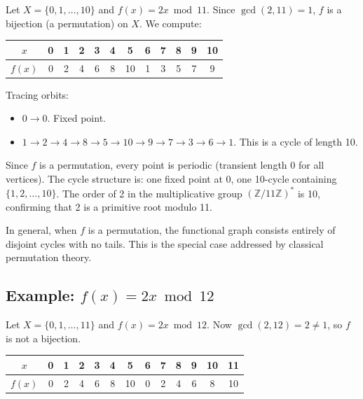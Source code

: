 Let $X = \{ 0, 1, \ldots, 10\} $ and $f(x) = 2x \bmod 11$. Since $\gcd(2, 11) = 1$, $f$ is a bijection (a permutation) on $X$. We compute:

\begin{center}
\begin{tabular}{cccccccccccc}
\toprule
$x$ & 0 & 1 & 2 & 3 & 4 & 5 & 6 & 7 & 8 & 9 & 10 \\
\midrule
$f(x)$ & 0 & 2 & 4 & 6 & 8 & 10 & 1 & 3 & 5 & 7 & 9 \\
\bottomrule
\end{tabular}
\end{center}

Tracing orbits:
\begin{itemize}
\item $0 \to 0$. Fixed point.
\item $1 \to 2 \to 4 \to 8 \to 5 \to 10 \to 9 \to 7 \to 3 \to 6 \to 1$. This is a cycle of length 10.
\end{itemize}

Since $f$ is a permutation, every point is periodic (transient length 0 for all vertices). The cycle structure is: one fixed point at 0, one 10-cycle containing $\{ 1, 2, \ldots, 10\} $. The order of 2 in the multiplicative group $(\mathbb{Z}/11\mathbb{Z})^*$ is 10, confirming that 2 is a primitive root modulo 11.

In general, when $f$ is a permutation, the functional graph consists entirely of disjoint cycles with no tails. This is the special case addressed by classical permutation theory.

\subsection*{Example: $f(x) = 2x \bmod 12$}

Let $X = \{ 0, 1, \ldots, 11\} $ and $f(x) = 2x \bmod 12$. Now $\gcd(2, 12) = 2 \neq 1$, so $f$ is not a bijection.

\begin{center}
\begin{tabular}{ccccccccccccc}
\toprule
$x$ & 0 & 1 & 2 & 3 & 4 & 5 & 6 & 7 & 8 & 9 & 10 & 11 \\
\midrule
$f(x)$ & 0 & 2 & 4 & 6 & 8 & 10 & 0 & 2 & 4 & 6 & 8 & 10 \\
\bottomrule
\end{tabular}
\end{center}


